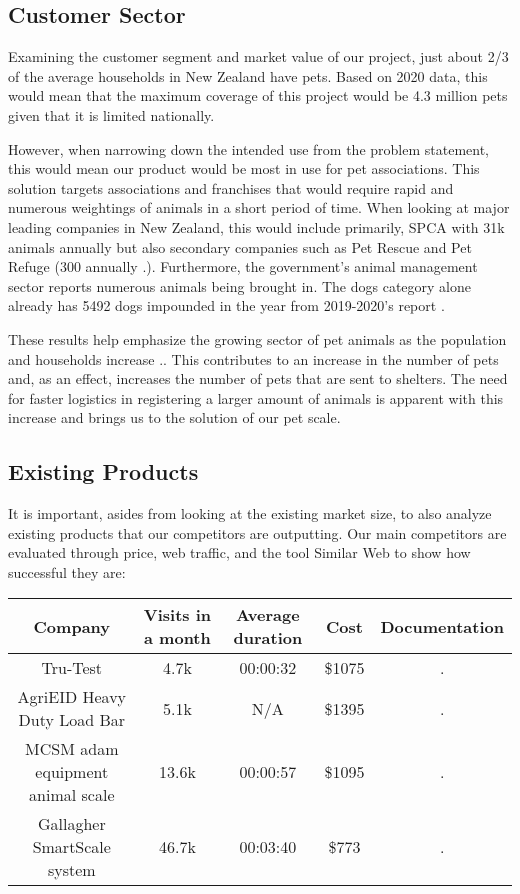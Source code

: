 \subsection{Customer Sector}
Examining the customer segment and market value of our project, just about 2/3 of the average households in New Zealand have pets. Based on 2020 data, this would mean that the maximum coverage of this project would be 4.3 million pets\cite{pd1}\cite{pd2} given that it is limited nationally.

However, when narrowing down the intended use from the problem statement, this would mean our product would be most in use for pet associations. This solution targets associations and franchises that would require rapid and numerous weightings of animals in a short period of time. When looking at major leading companies in New Zealand, this would include primarily, SPCA with 31k animals annually but also secondary companies such as Pet Rescue and Pet Refuge (300 annually  \cite{pd4}.). Furthermore, the government's animal management sector reports numerous animals being brought in. The dogs category alone already has 5492 dogs impounded in the year from 2019-2020's report \cite{pd5}.

These results help emphasize the growing sector of pet animals as the population and households increase  \cite{pd3}.. This contributes to an increase in the number of pets and, as an effect, increases the number of pets that are sent to shelters. The need for faster logistics in registering a larger amount of animals is apparent with this increase and brings us to the solution of our pet scale.

\subsection{Existing Products}
It is important, asides from looking at the existing market size, to also analyze existing products that our competitors are outputting. Our main competitors are evaluated through price, web traffic, and the tool Similar Web to show how successful they are:

\begin{center}
\begin{tabular}{ |c|c|c|c|c| } 
 \hline
 Company & Visits in a month & Average duration & Cost & Documentation \\ 
 \hline
Tru-Test & 4.7k & 00:00:32 & \$1075 &  \cite{pd6}. \\ 
 \hline
 AgriEID Heavy Duty Load Bar & 5.1k & N/A & \$1395 &  \cite{pd7}. \\ 
 \hline
 MCSM adam equipment animal scale & 13.6k & 00:00:57 & \$1095 &  \cite{pd8}. \\ 
 \hline
 Gallagher SmartScale system & 46.7k & 00:03:40 & \$773 &  \cite{pd9}. \\ 
 \hline
\end{tabular}
\end{center}

